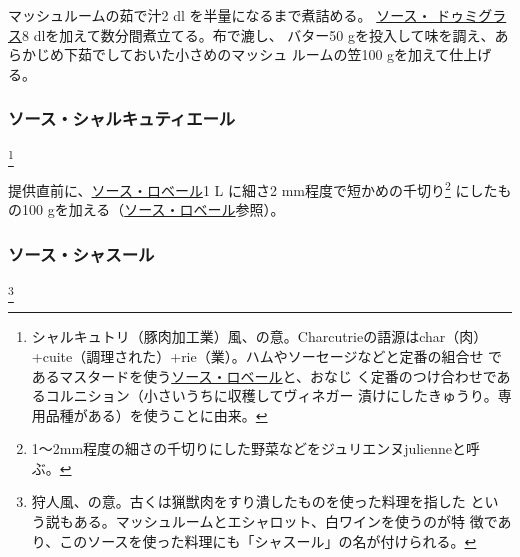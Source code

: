 \begin{recette}
マッシュルームの茹で汁2\undemi{} dl を半量になるまで煮詰める。
\protect\hyperlink{sauce-demi-glace}{ソース・ ドゥミグラス}8
dlを加えて数分間煮立てる。布で漉し、 バター50
gを投入して味を調え、あらかじめ下茹でしておいた小さめのマッシュ
ルームの笠100 gを加えて仕上げる。

\hypertarget{sauce-charcutiere}{%
\subsubsection{ソース・シャルキュティエール}\label{sauce-charcutiere}}

\footnote{シャルキュトリ（豚肉加工業）風、の意。Charcutrieの語源はchar（肉）
  +cuite（調理された）+rie（業）。ハムやソーセージなどと定番の組合せ
  であるマスタードを使う\protect\hyperlink{sauce-robert}{ソース・ロベール}と、おなじ
  く定番のつけ合わせであるコルニション（小さいうちに収穫してヴィネガー
  漬けにしたきゅうり。専用品種がある）を使うことに由来。}


提供直前に、\protect\hyperlink{sauce-robert}{ソース・ロベール}1 L
に細さ2 mm程度で短かめの千切り\footnote{1〜2mm程度の細さの千切りにした野菜などをジュリエンヌjulienneと呼
  ぶ。} にしたもの100
gを加える（\protect\hyperlink{sauce-robert}{ソース・ロベール}参照）。

\hypertarget{sauce-chasseur}{%
\subsubsection{ソース・シャスール}\label{sauce-chasseur}}

\footnote{狩人風、の意。古くは猟獣肉をすり潰したものを使った料理を指した
  という説もある。マッシュルームとエシャロット、白ワインを使うのが特
  徴であり、このソースを使った料理にも「シャスール」の名が付けられる。}



\end{recette}
